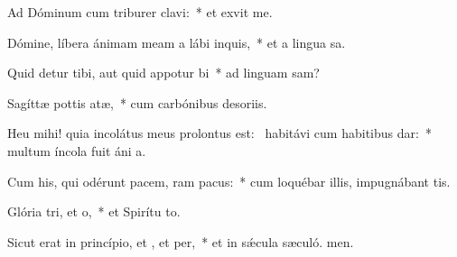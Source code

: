 \item Ad Dóminum cum triburer clavi:~* et exvit me.
\item Dómine, líbera ánimam meam a lábi inquis,~* et a lingua sa.
\item Quid detur tibi, aut quid appotur bi~* ad linguam sam?
\item Sagíttæ pottis atæ,~* cum carbónibus desoriis.
\item Heu mihi! quia incolátus meus prolontus est:~\pscross{} habitávi cum habitibus dar:~* multum íncola fuit áni a.
\item Cum his, qui odérunt pacem, ram pacus:~* cum loquébar illis, impugnábant  tis.
\item Glória tri, et o,~* et Spirítu to.
\item Sicut erat in princípio, et , et per,~* et in sǽcula sæculó. men.
